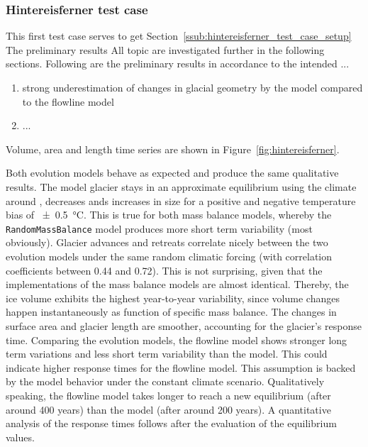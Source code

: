       \subsubsection{Hintereisferner test case} %
      \label{ssub:hintereisferner_test_case_results}

        This first test case serves to get Section~\ref{ssub:hintereisferner_test_case_setup}
        The preliminary results 
        All topic are investigated further in the following sections. Following are the preliminary results in accordance to the intended ...
        \begin{enumerate}[label=(\alph*)]
          \item strong underestimation of changes in glacial geometry by the \vas{} model compared to the flowline model
          \item ...
        \end{enumerate}
        Volume, area and length time series are shown in Figure~\ref{fig:hintereisferner}.

        Both evolution models behave as expected and produce the same qualitative results. The model glacier stays in an approximate equilibrium using the climate around \tstar, decreases ands increases in size for a positive and negative temperature bias of \SI{\pm0.5}{\celsius}. This is true for both mass balance models, whereby the \lstinline`RandomMassBalance` model produces more short term variability (most obviously).
        Glacier advances and retreats correlate nicely between the two evolution models under the same random climatic forcing (with correlation coefficients between 0.44 and 0.72). This is not surprising, given that the implementations of the mass balance models are almost identical. Thereby, the ice volume exhibits the highest year-to-year variability, since volume changes happen instantaneously as function of specific mass balance. The changes in surface area and glacier length are smoother, accounting for the glacier's response time.
        Comparing the evolution models, the flowline model shows stronger long term variations and less short term variability than the \vas{} model. This could indicate higher response times for the flowline model. This assumption is backed by the model behavior under the constant climate scenario. Qualitatively speaking, the flowline model takes longer to reach a new equilibrium (after around 400 years) than the \vas{} model (after around 200 years). A quantitative analysis of the response times follows after the evaluation of the equilibrium values.


